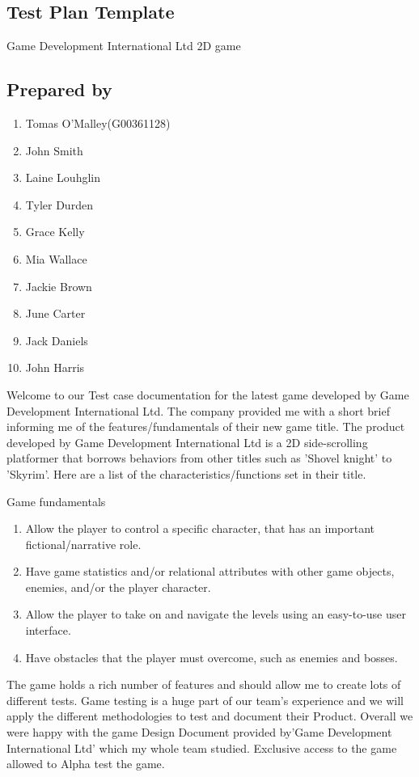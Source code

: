 
\subsection{Test Plan Template}
Game Development International Ltd 2D game 
\subsection{Prepared by }


\begin{enumerate}
  	\item Tomas O'Malley(G00361128)
  	\item John Smith 
	\item Laine Louhglin 
	\item Tyler Durden 
	\item Grace Kelly 
	\item Mia Wallace
	\item Jackie Brown
	\item June  Carter 
	\item Jack Daniels
	\item John  Harris



\end{enumerate}


Welcome to our Test case documentation for the latest game developed by Game Development International Ltd.
The company provided me with a short brief informing me of the features/fundamentals of their new game title.
The product developed by  Game Development International Ltd is a 2D side-scrolling platformer that borrows
behaviors from other titles such as 'Shovel knight' to 'Skyrim'. Here are a list of the characteristics/functions
set in their title.


\centerline{Game fundamentals}

\begin{enumerate}
  \item Allow the player to control a specific character, that has an important
fictional/narrative role.
  \item Have game statistics and/or relational attributes with other game objects, enemies,
and/or the player character.

\item Allow the player to take on and navigate the levels using an easy-to-use user
interface.

\item Have obstacles that the player must overcome, such as enemies and bosses.
\end{enumerate}

The game holds a rich number of features and should allow me to create lots of different tests. Game testing is a huge part of our team's experience and we will apply the different methodologies to test and document their Product. Overall we were happy with the game Design Document provided by'Game Development International Ltd' which my whole team studied. Exclusive access to the game allowed to Alpha test the game.